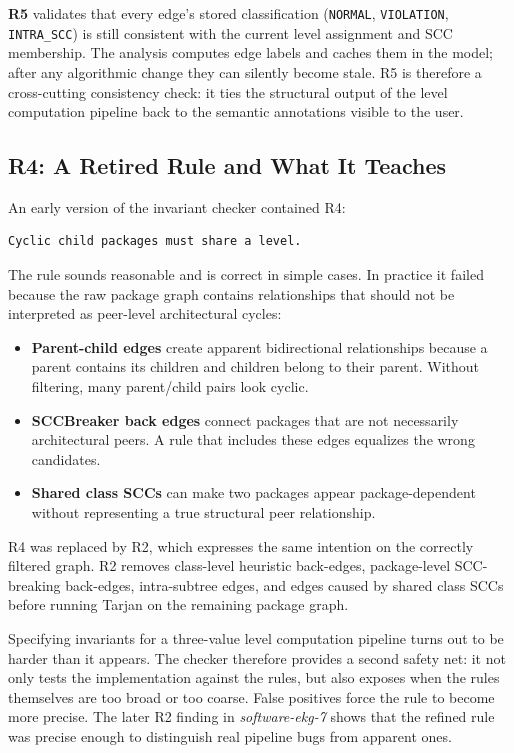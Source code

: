 \documentclass[a4paper,twoside]{article}
\begin{document}
\textbf{R5} validates that every edge's stored classification
(\texttt{NORMAL}, \texttt{VIOLATION}, \texttt{INTRA\_SCC}) is still consistent with
the current level assignment and SCC membership.
The analysis computes edge labels and caches them in the model; after any algorithmic
change they can silently become stale.
R5 is therefore a cross-cutting consistency check: it ties the structural output of the
level computation pipeline back to the semantic annotations visible to the user.

\subsection*{R4: A Retired Rule and What It Teaches}

An early version of the invariant checker contained R4:

\begin{verbatim}
Cyclic child packages must share a level.
\end{verbatim}

The rule sounds reasonable and is correct in simple cases. In practice it
failed because the raw package graph contains relationships that should not be
interpreted as peer-level architectural cycles:

\begin{itemize}
  \item \textbf{Parent-child edges} create apparent bidirectional relationships
        because a parent contains its children and children belong to their
        parent. Without filtering, many parent/child pairs look cyclic.
  \item \textbf{SCCBreaker back edges} connect packages that are not
        necessarily architectural peers. A rule that includes these edges
        equalizes the wrong candidates.
  \item \textbf{Shared class SCCs} can make two packages appear
        package-dependent without representing a true structural peer
        relationship.
\end{itemize}

R4 was replaced by R2, which expresses the same intention on the correctly
filtered graph. R2 removes class-level heuristic back-edges, package-level
SCC-breaking back-edges, intra-subtree edges, and edges caused by shared class
SCCs before running Tarjan on the remaining package graph.

Specifying invariants for a three-value level computation pipeline turns out to be
harder than it appears. The checker therefore provides a second safety
net: it not only tests the implementation against the rules, but also exposes
when the rules themselves are too broad or too coarse. False positives force the rule to
become more precise. The later R2 finding in \emph{software-ekg-7} shows that
the refined rule was precise enough to distinguish real pipeline bugs from
apparent ones.
\end{document}
